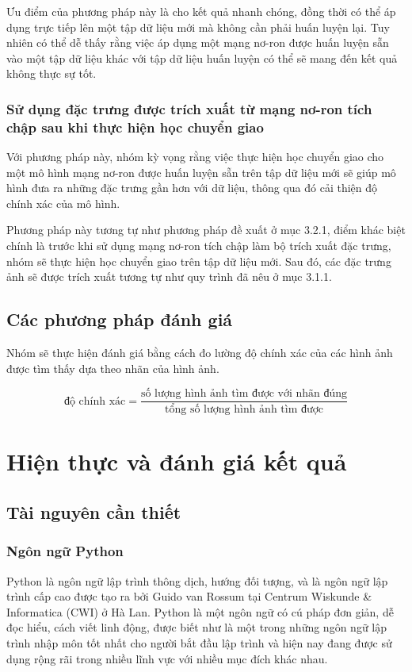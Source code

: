 \documentclass[a4paper,14pt]{extreport}
\begin{document}
Ưu điểm của phương pháp này là cho kết quả nhanh chóng, đồng thời có thể áp dụng trực tiếp lên một tập 
dữ liệu mới mà không cần phải huấn luyện lại. Tuy nhiên có thể dễ thấy rằng việc áp dụng một mạng nơ-ron 
được huấn luyện sẵn vào một tập dữ liệu khác với tập dữ liệu huấn luyện có thể sẽ mang đến kết quả không thực sự tốt.



\subsection{Sử dụng đặc trưng được trích xuất từ mạng nơ-ron tích chập sau khi thực hiện học chuyển giao }

Với phương pháp này, nhóm kỳ vọng rằng việc thực hiện học chuyển giao cho một mô hình mạng nơ-ron 
được huấn luyện sẵn trên tập dữ liệu mới sẽ giúp mô hình đưa ra những đặc trưng gần hơn với dữ liệu, 
thông qua đó cải thiện độ chính xác của mô hình.

Phương pháp này tương tự như phương pháp đề xuất ở mục 3.2.1, điểm khác biệt chính là trước khi sử dụng mạng nơ-ron tích chập làm bộ trích xuất đặc trưng, nhóm sẽ thực hiện học chuyển giao trên tập dữ liệu mới. Sau đó, các đặc trưng ảnh sẽ được trích xuất tương tự như quy trình đã nêu ở mục 3.1.1.

\section{ Các phương pháp đánh giá }
Nhóm sẽ thực hiện đánh giá bằng cách đo lường độ chính xác của các hình ảnh được tìm thấy dựa theo nhãn 
của hình ảnh.

\[ \text{độ chính xác} = \frac{\text{số lượng hình ảnh tìm được với nhãn đúng}}{\text{tổng số lượng hình ảnh tìm được}} \]
\chapter{Hiện thực và đánh giá kết quả}
\section{Tài nguyên cần thiết}
\subsection{Ngôn ngữ Python}

Python là ngôn ngữ lập trình thông dịch, hướng đối tượng, và là ngôn ngữ lập trình cấp cao được tạo ra bởi Guido van Rossum tại Centrum Wiskunde & Informatica (CWI) ở Hà Lan. Python là một ngôn ngữ có cú pháp đơn giản, dễ đọc hiểu, cách viết linh động, được biết như là một trong những ngôn ngữ lập trình nhập môn tốt nhất cho người bắt đầu lập trình và hiện nay đang được sử dụng rộng rãi trong nhiều lĩnh vực với nhiều mục đích khác nhau.
\end{document}
